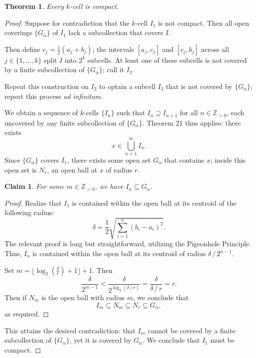 \documentclass[11pt]{article}
\newtheorem{theorem}{Theorem}
\newtheorem{claim}{Claim}
\begin{document}
\begin{theorem}
	Every $k$-cell is compact.
\end{theorem}
\begin{adjustwidth}{1cm}{}
	\begin{proof}
		Suppose for contradiction that the $k$-cell $I_{1}$ is not compact. Then all open coverings $\{ G_{\alpha} \}$ of $I_{1}$ lack a subcollection that covers $I$.

		Then define $c_{j} = \tfrac{1}{2}(a_{j} + b_{j})$; the intervals $[a_{j}, c_{j}]$ and $[c_{j}, b_{j}]$ across all $j \in \{ 1, \ldots, k \}$ split $I$ into $2^{k}$ subcells. At least one of these subcells is not covered by a finite subcollection of $\{ G_{\alpha} \}$; call it $I_{2}$. 

		Repeat this construction on $I_{2}$ to optain a subcell $I_{3}$ that is not covered by $\{ G_{\alpha} \}$; repeat this process \textit{ad infinitum}.

		\newpage

		We obtain a sequence of $k$-cells $\{ I_{n} \}$ such that $I_{n} \supseteq I_{n + 1}$ for all $n \in \mathbb{Z}_{> 0}$, each uncovered by any finite subcollection of $\{ G_{\alpha} \}$. Theorem 21 thus applies: there exists 
		\[
			x \in \bigcup\limits_{n = 1}^{\infty} I_{n}.
		\]
		Since $\{ G_{\alpha} \}$ covers $I_{1}$, there exists some open set $G_{\alpha}$ that contains $x$; inside this open set is $N_{r}$, an open ball at $x$ of radius $r$.
		\begin{adjustwidth}{1cm}{}
			\begin{claim}
				For some $m \in \mathbb{Z}_{> 0}$, we have $I_{n} \subseteq G_{\alpha}$.
			\end{claim}
			\begin{proof}\renewcommand{\qedsymbol}{}
				Realize that $I_{1}$ is contained within the open ball at its centroid of the following radius:
				\[
					\delta = \frac{1}{2} \sqrt{\sum\limits_{i = 1}^{n} (b_{i} - a_{i})^{2}}.
				\]
				The relevant proof is long but straightforward, utilizing the Pigeonhole Principle. Thus, $I_{n}$ is contained within the open ball at its centroid of radius $\delta \,/\, 2^{n - 1}$.

				Set $m = \lfloor \log_{2}\left( \tfrac{\delta}{r} \right) + 1 \rfloor + 1$. Then
				\[
					\frac{\delta}{2^{m - 1}} < \frac{\delta}{2^{\log_{2}(\delta \,/\, r)}} = \frac{\delta}{\delta \,/\, r} = r.
				\]
				Then if $N_{m}$ is the open ball with radius $m$, we conclude that
				\[
					I_{m} \subseteq N_{m} \subseteq N_{r} \subseteq G_{\alpha},
				\]
				as required.
			\end{proof}
		\end{adjustwidth}
		This attains the desired contradiction: that $I_{m}$ cannot be covered by a finite subcollection of $\{ G_{\alpha} \}$, yet it is covered by $G_{\alpha}$. We conclude that $I_{1}$ must be compact.
	\end{proof}
\end{adjustwidth}
\end{document}
